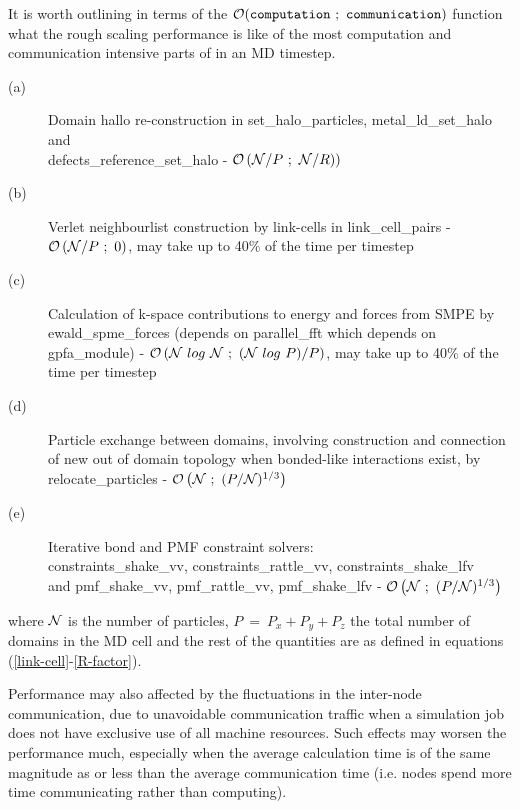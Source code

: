 It is worth outlining in terms of the
${\cal O}({\tt computation~;~communication})$ function what the
rough scaling performance is like of the most computation and
communication intensive parts of \D in an MD timestep.
\begin{description}
\item[(a)] Domain hallo re-construction in {\sc set\_halo\_particles},
{\sc metal\_ld\_set\_halo} and \\ {\sc defects\_reference\_set\_halo} -
${\cal O}\left({\cal N}/P~;~{\cal N}/R)\right)$
\item[(b)] Verlet neighbourlist construction by link-cells in
{\sc link\_cell\_pairs} - ${\cal O}\left({\cal N}/P~;~0\right)$,
may take up to 40\% of the time per timestep
\item[(c)] Calculation of k-space contributions to energy and forces
from SMPE by {\sc ewald\_spme\_forces} (depends on {\sc parallel\_fft}
which depends on {\sc gpfa\_module}) -
${\cal O}\left({\cal N}~{\normalfont log}~{\cal N}~;~({\cal N}~{\normalfont log}~P)/P\right)$,
may take up to 40\% of the time per timestep
\item[(d)] Particle exchange between domains, involving construction
and connection of new out of domain topology when bonded-like
interactions exist, by {\sc relocate\_particles} -
${\cal O}\left({\cal N}~;~(P/{\cal N})^{1/3}\right)$
\item[(e)] Iterative bond and PMF constraint solvers: \\
{\sc constraints\_shake\_vv}, {\sc constraints\_rattle\_vv}, {\sc constraints\_shake\_lfv} \\
and {\sc pmf\_shake\_vv}, {\sc pmf\_rattle\_vv}, {\sc pmf\_shake\_lfv} -
${\cal O}\left({\cal N}~;~(P/{\cal N})^{1/3}\right)$
\end{description}
where ${\cal N}$ is the number of particles, $P~=~P_{x}+P_{y}+P_{z}$ the
total number of domains in the MD cell and the rest of the quantities
are as defined in equations (\ref{link-cell}-\ref{R-factor}).

Performance may also affected by the fluctuations in the inter-node
communication, due to unavoidable communication traffic when a
simulation job does not have exclusive use of all machine resources.
Such effects may worsen the performance much, especially when the
average calculation time is of the same magnitude as or less than
the average communication time (i.e. nodes spend more time
communicating rather than computing).
